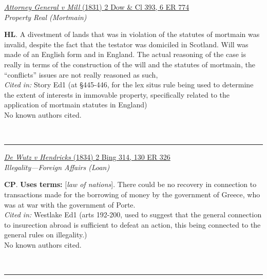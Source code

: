 \documentclass[twoside]{article}
\begin{document}
        \begin{small}
        \begin{center}
        \href{https://heinonline.org/HOL/P?h=hein.engrep/engra0006&i=786}{\textit{Attorney General v Mill} (1831) 2 Dow \& Cl 393, 6 ER 774} \label{136} \\ 
\textit{Property Real (Mortmain)}\\
        \end{center}
        \textbf{HL}. A divestment of lands that was in violation of the statutes of mortmain was invalid, despite the fact that the testator was domiciled in Scotland. Will was made of an English form and in England. The actual reasoning of the case is really in terms of the construction of the will and the statutes of mortmain, the “conflicts” issues are not really reasoned as such,\\\textit{Cited in: }Story Ed1 (at §445-446, for the lex situs rule being used to determine the extent of interests in immovable property, specifically related to the application of mortmain statutes in England)\\No known authors cited.
        \end{small}\\
        \rule{\textwidth}{0.5pt}
        

        \begin{small}
        \begin{center}
        \href{https://heinonline.org/HOL/P?h=hein.engrep/engrg0130&i=330}{\textit{De Wutz v Hendricks} (1834) 2 Bing 314, 130 ER 326} \label{72} \\ 
\textit{Illegality---Foreign Affairs (Loan)}\\
        \end{center}
        \textbf{CP}.  \textbf{Uses terms: }[\textit{law of nations}]. There could be no recovery in connection to transactions made for the borrowing of money by the government of Greece, who was at war with the government of Porte.\\\textit{Cited in: }Westlake Ed1 (arts 192-200, used to suggest that the general connection to insurection abroad is sufficient to defeat an action, this being connected to the general rules on illegality.)\\No known authors cited.
        \end{small}\\
        \rule{\textwidth}{0.5pt}
        
\end{document}
